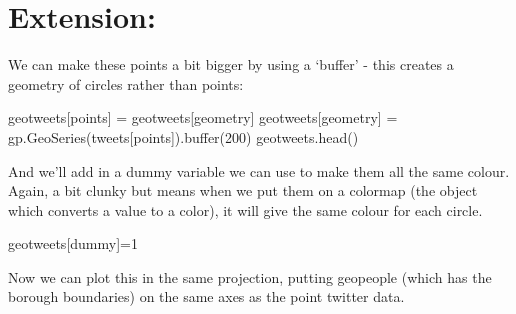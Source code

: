 \documentclass[
  letterpaper,
  DIV=11,
  numbers=noendperiod]{scrreprt}
\newenvironment{Shaded}{\begin{snugshade}}{\end{snugshade}}
\newcommand{\BuiltInTok}[1]{\textcolor[rgb]{0.00,0.23,0.31}{#1}}
\newcommand{\DecValTok}[1]{\textcolor[rgb]{0.68,0.00,0.00}{#1}}
\newcommand{\NormalTok}[1]{\textcolor[rgb]{0.00,0.23,0.31}{#1}}
\newcommand{\OperatorTok}[1]{\textcolor[rgb]{0.37,0.37,0.37}{#1}}
\newcommand{\StringTok}[1]{\textcolor[rgb]{0.13,0.47,0.30}{#1}}
\begin{document}
\hypertarget{extension-2}{%
\section{Extension:}\label{extension-2}}

We can make these points a bit bigger by using a `buffer' - this creates
a geometry of circles rather than points:

\begin{Shaded}
\begin{Highlighting}[]
\NormalTok{geotweets[}\StringTok{\textquotesingle{}points\textquotesingle{}}\NormalTok{] }\OperatorTok{=}\NormalTok{ geotweets[}\StringTok{\textquotesingle{}geometry\textquotesingle{}}\NormalTok{]}
\NormalTok{geotweets[}\StringTok{\textquotesingle{}geometry\textquotesingle{}}\NormalTok{] }\OperatorTok{=}\NormalTok{ gp.GeoSeries(tweets[}\StringTok{\textquotesingle{}points\textquotesingle{}}\NormalTok{]).}\BuiltInTok{buffer}\NormalTok{(}\DecValTok{200}\NormalTok{)}
\NormalTok{geotweets.head()}
\end{Highlighting}
\end{Shaded}

And we'll add in a dummy variable we can use to make them all the same
colour. Again, a bit clunky but means when we put them on a colormap
(the object which converts a value to a color), it will give the same
colour for each circle.

\begin{Shaded}
\begin{Highlighting}[]
\NormalTok{geotweets[}\StringTok{\textquotesingle{}dummy\textquotesingle{}}\NormalTok{]}\OperatorTok{=}\DecValTok{1}
\end{Highlighting}
\end{Shaded}

Now we can plot this in the same projection, putting geopeople (which
has the borough boundaries) on the same axes as the point twitter data.
\end{document}
